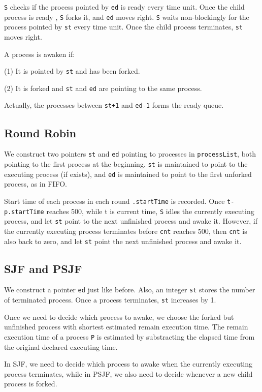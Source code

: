 \documentclass{article}
\begin{document}
        {\tt S} checks if the process pointed by {\tt ed} is ready every time unit. Once the child process is ready , {\tt S} forks it, and {\tt ed} moves right. {\tt S} waits non-blockingly for the process pointed by {\tt st} every time unit. Once the child process terminates, {\tt st} moves right.

        A process is awaken if: 

        (1) It is pointed by {\tt st} and has been forked.

        (2) It is forked and {\tt st} and {\tt ed} are pointing to the same process.

        Actually, the processes between {\tt st+1} and {\tt ed-1} forms the ready queue.

    \subsection{Round Robin}
        We construct two pointers {\tt st} and {\tt ed} pointing to processes in {\tt processList}, both pointing to the first process at the beginning. {\tt st} is maintained to point to the executing process (if exists), and {\tt ed} is maintained to point to the first unforked process, as in FIFO.

        Start time of each process in each round {\tt .startTime} is recorded. Once {\tt t-p.startTime} reaches 500, while t is current time, {\tt S} idles the currently executing process, and let {\tt st} point to the next unfinished process and awake it. However, if the currently executing process terminates before {\tt cnt} reaches 500, then {\tt cnt} is also back to zero, and let {\tt st} point the next unfinished process and awake it.

    \subsection{SJF and PSJF}
        We construct a pointer {\tt ed} just like before. Also, an integer {\tt st} stores the number of terminated process. Once a process terminates, {\tt st} increases by 1.

        Once we need to decide which process to awake, we choose the forked but unfinished process with shortest estimated remain execution time. The remain execution time of a process {\tt P} is estimated by substracting the elapsed time from the original declared executing time.
        
        In SJF, we need to decide which process to awake when the currently executing process terminates, while in PSJF, we also need to decide whenever a new child process is forked.
\end{document}
